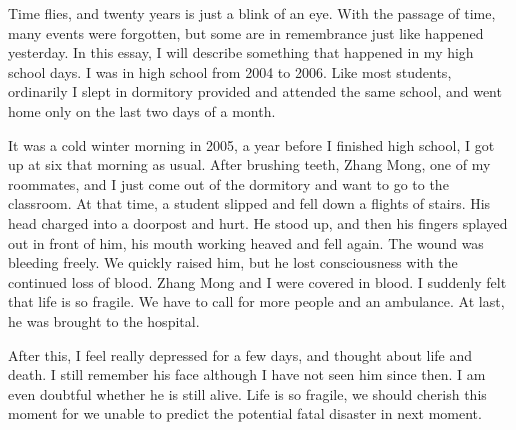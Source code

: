 \documentclass[12pt,a4paper]{caspset}
\begin{document}

Time flies, and twenty years is just a blink of an eye. With the passage of time, many events were forgotten, but some are in remembrance just like happened yesterday. In this essay, I will describe something that happened in my high school days. I was in high school from 2004 to 2006. Like most students, ordinarily I slept in dormitory provided and attended the same school, and went home only on the last two days of a month.

It was a cold winter morning in 2005, a year before I finished high school, I got up at six that morning as usual. After brushing teeth, Zhang Mong, one of my roommates, and I just come out of the dormitory and want to go to the classroom. At that time, a student slipped and fell down a flights of stairs. His head charged into a doorpost and hurt. He stood up, and then his fingers splayed out in front of him, his mouth working heaved and fell again. The wound was bleeding freely. We quickly raised him, but he lost consciousness with the continued loss of blood. Zhang Mong and I were covered in blood. I suddenly felt that life is so fragile. We have to call for more people and an ambulance. At last, he was brought to the hospital. 

After this, I feel really depressed for a few days, and thought about life and death. I still remember his face although I have not seen him since then. I am even doubtful whether he is still alive. Life is so fragile, we should cherish this moment for we unable to predict the potential fatal disaster in next moment.
\end{document}
